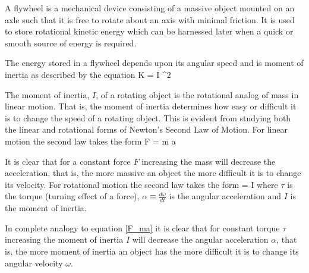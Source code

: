 A flywheel is a mechanical device consisting of a massive object mounted on an axle such that it is free to rotate about an axis with minimal friction. It is used to store rotational kinetic energy which can be harnessed later when a quick or smooth source of energy is required.

The energy stored in a flywheel depends upon its angular speed and is moment of inertia as described by the equation
%
\beq
    K =  I \omega^2
\eeq
%

The moment of inertia, $I$, of a rotating object is the rotational analog of mass in linear motion. That is, the moment of inertia determines how easy or difficult it is to change the speed of a rotating object. This is evident from studying both the linear and rotational forms of Newton's Second Law of Motion. For linear motion the second law takes the form
%
\beq \label{F_ma}
    F = m a
\eeq

It is clear that for a constant force $F$ increasing the mass will decrease the acceleration, that is, the more massive an object the more difficult it is to change its velocity. For rotational motion the second law takes the form
%
\beq
    \tau = I \alpha
\eeq
%
where $\tau$ is the torque (turning effect of a force), $\displaystyle \alpha \equiv \frac{d \omega}{dt}$ is the angular acceleration and $I$ is the moment of inertia.

In complete analogy to equation \eqref{F_ma} it is clear that for constant torque $\tau$ increasing the moment of inertia $I$ will decrease the angular acceleration $\alpha$, that is, the more moment of inertia an object has the more difficult it is to change its angular velocity $\omega$.
